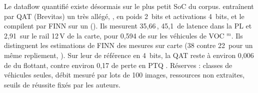 Le dataflow quantifié existe désormais sur le plus petit SoC du corpus.
\citet{arxiv-2609.24757-npu-accelerator-quantized-real-time}\pp{} entraînent par QAT
(Brevitas) un  très allégé, , en poids 2~bits et activations
4~bits, et le compilent par FINN sur un   (). Ils mesurent 35,66\,,
45,1\, de latence dans la PL et 2,91\, sur le rail 12\,V de la carte, pour 0,594 de
 sur les véhicules de VOC $^{m}$. Ils distinguent les
estimations de FINN des mesures sur carte (38 contre 22\, pour un même repliement,
). Sur leur  de référence en 4~bits, la QAT reste à environ 0,006
de  du flottant, contre environ 0,17 de perte en PTQ . Réserves : classes de
véhicules seules, débit mesuré par lots de 100 images, ressources non extraites, seuils de
réussite fixés par les auteurs.

